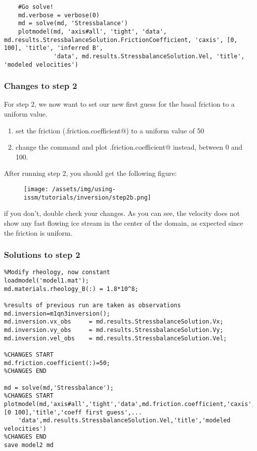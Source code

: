 \begin{verbatim}
    #Go solve!
    md.verbose = verbose(0)
    md = solve(md, 'Stressbalance')
    plotmodel(md, 'axis#all', 'tight', 'data', md.results.StressbalanceSolution.FrictionCoefficient, 'caxis', [0, 100], 'title', 'inferred B',
              'data', md.results.StressbalanceSolution.Vel, 'title', 'modeled velocities')\end{verbatim}

\subsubsection{Changes to step 2}
For step 2, we now want to set our new first guess for the basal friction to a uniform value.
\begin{enumerate}
	\item set the friction (\verb@md.friction.coefficient@) to a uniform value of 50
	\item change the \verb@plotmodel@ command and plot \verb@md.friction.coefficient@ instead, between 0 and 100.
\end{enumerate}
After running step 2, you should get the following figure:
\begin{figure}[H]
	\begin{center}
		\texttt{[image: /assets/img/using-issm/tutorials/inversion/step2b.png]}
	\end{center}
\end{figure}
if you don't, double check your changes. As you can see, the velocity does not show any fast flowing ice stream in the center of the domain, as expected since the friction is uniform.

\subsubsection{Solutions to step 2}
\begin{verbatim}%Modify rheology, now constant
loadmodel('model1.mat');
md.materials.rheology_B(:) = 1.8*10^8;

%results of previous run are taken as observations
md.inversion=m1qn3inversion();
md.inversion.vx_obs		= md.results.StressbalanceSolution.Vx;
md.inversion.vy_obs		= md.results.StressbalanceSolution.Vy;
md.inversion.vel_obs	= md.results.StressbalanceSolution.Vel;

%CHANGES START
md.friction.coefficient(:)=50;
%CHANGES END

md = solve(md,'Stressbalance');
%CHANGES START
plotmodel(md,'axis#all','tight','data',md.friction.coefficient,'caxis',[0 100],'title','coeff first guess',...
	'data',md.results.StressbalanceSolution.Vel,'title','modeled velocities')
%CHANGES END
save model2 md\end{verbatim}

